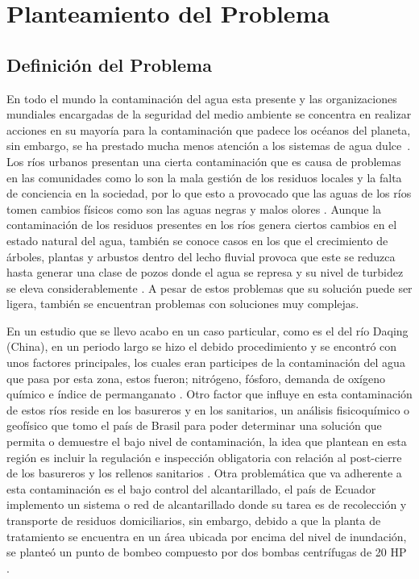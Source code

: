 \section{Planteamiento del Problema}
\subsection{Definición del Problema}
En todo el mundo la contaminación del agua esta presente y las organizaciones mundiales encargadas de la seguridad del medio ambiente se concentra en realizar acciones en su mayoría para la contaminación que padece los océanos del planeta, sin embargo, se ha prestado mucha menos atención a los sistemas de agua dulce~\cite{Blettler2017}. Los ríos urbanos presentan una cierta contaminación que es causa de problemas en las comunidades como lo son la mala gestión de los residuos locales y la falta de conciencia en la sociedad, por lo que esto a provocado que las aguas de los ríos tomen cambios físicos como son las aguas negras y malos olores \cite{Gastezzi-Arias2016}. Aunque la contaminación de los residuos presentes en los ríos genera ciertos cambios en el estado natural del agua, también se conoce casos en los que el crecimiento de árboles, plantas y arbustos dentro del lecho fluvial provoca que este se reduzca hasta generar una clase de pozos donde el agua se represa y su nivel de turbidez se eleva considerablemente \cite{Stepien2019}. A pesar de estos problemas que su solución puede ser ligera, también se encuentran problemas con soluciones muy complejas.

En un estudio que se llevo acabo en un caso particular, como es el del río Daqing (China), en un periodo largo se hizo el debido procedimiento y se encontró con unos factores principales, los cuales eran participes de la contaminación del agua que pasa por esta zona, estos fueron; nitrógeno, fósforo, demanda de oxígeno químico e índice de permanganato \cite{He2021}. Otro factor que influye en esta contaminación de estos ríos reside en los basureros y en los sanitarios, un análisis fisicoquímico o geofísico que tomo el país de Brasil para poder determinar una solución que permita o demuestre el bajo nivel de contaminación, la idea que plantean en esta región es incluir la regulación e inspección obligatoria con relación al post-cierre de los basureros y los rellenos sanitarios \cite{Morita2021}. Otra problemática que va adherente a esta contaminación es el bajo control del alcantarillado, el país de Ecuador implemento un sistema o red de alcantarillado donde su tarea es de recolección y transporte de residuos domiciliarios, sin embargo, debido a que la planta de tratamiento se encuentra en un área ubicada por encima del nivel de inundación, se planteó un punto de bombeo compuesto por dos bombas centrífugas de 20 HP \cite{MERCHAN2021}.

